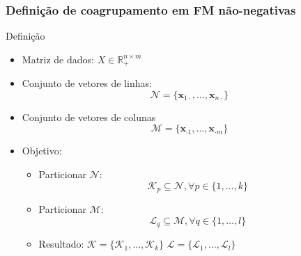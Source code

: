 \documentclass[10pt]{beamer}
\begin{document}





\begin{frame}
\frametitle{Definição de coagrupamento em FM não-negativas}

  \begin{block}{Definição}
    \begin{itemize}
      \item Matriz de dados: $X \in \mathbb{R}^{n \times m}_{+}$
      \item Conjunto de vetores de linhas:
        $$\mathcal{N} = \{ \mathbf{x}_{1 \cdot}, \dots, \mathbf{x}_{n \cdot} \}$$
      \item Conjunto de vetores de colunas
        $$\mathcal{M} = \{ \mathbf{x}_{\cdot 1}, \dots, \mathbf{x}_{\cdot m} \}$$
      \item Objetivo:
        \begin{itemize}
          \item Particionar $\mathcal{N}$:
            $$\mathcal{K}_p \subseteq \mathcal{N}, \forall p \in \{ 1, \dots, k\}$$
          \item Particionar $\mathcal{M}$:
            $$\mathcal{L}_q \subseteq \mathcal{M}, \forall q \in \{1, \dots, l\}$$
          \item Resultado:
            $\mathscr{K} = \{\mathcal{K}_1, \dots, \mathcal{K}_k\}$
            $\mathscr{L} = \{\mathcal{L}_1, \dots, \mathcal{L}_l\}$
        \end{itemize}
    \end{itemize}
  \end{block}

\end{frame}
\end{document}
